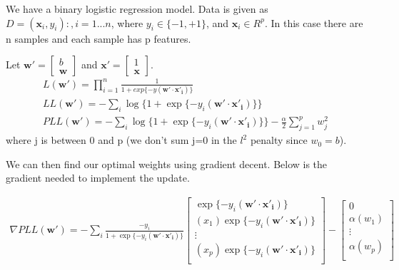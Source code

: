 \documentclass[runningheads]{llncs}
\begin{document}
We have a binary logistic regression model. Data is given as $D = {(\mathbf{x}_i, y_i):, i = 1...n}$, where $y_i \in \{-1, +1\}$, and $\mathbf{x}_i \in R^p$. In this case there are n samples and each sample has p features.

Let $ \mathbf{w'} =  \begin{bmatrix} b\\ \mathbf{w} \end{bmatrix}$ and $\mathbf{x}' = \begin{bmatrix} 1\\ \mathbf{x} \end{bmatrix}$. 
\begin{align*}
L(\mathbf{w'}) = \prod_{i=1}^{n} \frac{1}{1+exp\{-y(\mathbf{w'} \cdot \mathbf{x'_i})\}}\\
LL(\mathbf{w'}) = -\sum_i\log\{1+\exp\{-y_i(\mathbf{w'} \cdot \mathbf{x'_i})\}\}\\
PLL(\mathbf{w'}) = -\sum_i\log\{1+\exp\{-y_i(\mathbf{w'} \cdot \mathbf{x'_i})\}\}   - \frac{\alpha}{2}\sum_{j=1}^{p} w_j^2
\end{align*}
where j is between 0 and p (we don't sum j=0 in the $l^2$ penalty since $w_0=b$).
\newline

We can then find our optimal weights using gradient decent. Below is the gradient needed to implement the update.

\begin{align*}
\nabla PLL(\mathbf{w'}) = -\sum_i\frac{-y_i}{1+\exp\{-y_i(\mathbf{w'}\cdot \mathbf{x'_i})\}}\begin{bmatrix} \exp\{-y_i(\mathbf{w'}\cdot\mathbf{x'_i})\} \\ (x_1)\exp\{-y_i(\mathbf{w'}\cdot\mathbf{x'_i})\}\\ \vdots \\ (x_p)\exp\{-y_i(\mathbf{w'}\cdot\mathbf{x'_i})\}\\ \end{bmatrix} - \begin{bmatrix} 0 \\ \alpha(w_1) \\ \vdots \\ \alpha(w_p) \\ \end{bmatrix}
\end{align*}
 
\end{document}
